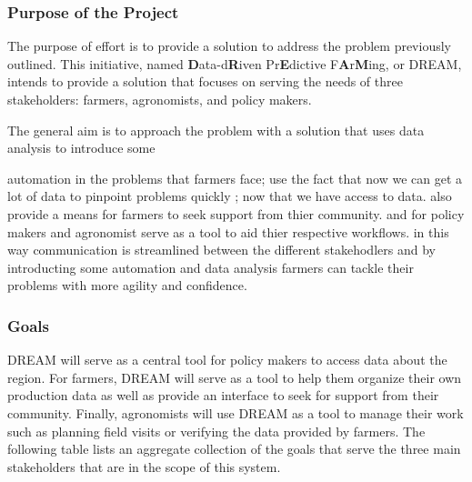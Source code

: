 \begin{flushleft}
\subsubsection{Purpose of the Project}
The purpose of effort is to provide a solution to address the problem previously outlined. 
This initiative, named {\bf D}ata-d{\bf R}iven Pr{\bf E}dictive F{\bf A}r{\bf M}ing, or DREAM, intends to provide a solution that focuses on serving the needs of three stakeholders: farmers, agronomists, and policy makers. 


The general aim is to approach the problem with a solution that uses data analysis to introduce some 

automation in the problems that farmers face; use the fact that now we can get a lot of data to pinpoint problems quickly ; now that we have access to data.
also provide a means for farmers to seek support from thier community. 
and for policy makers and agronomist serve as a tool to aid thier respective workflows. in this way communication is streamlined between the different stakehodlers and by introducting some automation and data analysis farmers can tackle their problems with more agility and confidence. %
\end{flushleft}

\subsubsection{Goals}

DREAM will serve as a central tool for policy makers to access data about the region. For farmers, DREAM will serve as a tool to help them organize their own production data as well as provide an interface to seek for support from their community. Finally, agronomists will use DREAM as a tool to manage their work such as planning field visits or verifying the data provided by farmers. 
The following table lists an aggregate collection of the goals that serve the three main stakeholders that are in the scope of this system.

